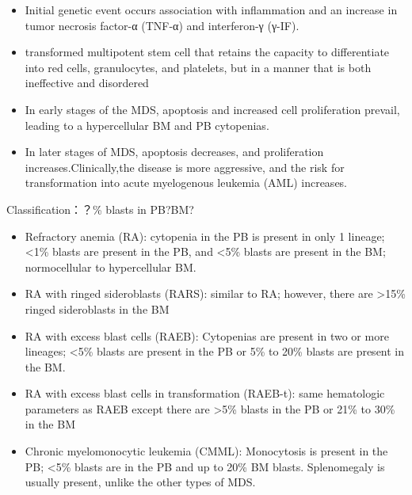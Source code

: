 \documentclass[
  ignorenonframetext,
]{beamer}
\begin{document}
\begin{frame}
\begin{itemize}
\item
  Initial genetic event occurs association with inflammation and an
  increase in tumor necrosis factor-α (TNF-α) and interferon-γ (γ-IF).
\item
  transformed multipotent stem cell that retains the capacity to
  differentiate into red cells, granulocytes, and platelets, but in a
  manner that is both ineffective and disordered
\item
  In early stages of the MDS, apoptosis and increased cell proliferation
  prevail, leading to a hypercellular BM and PB cytopenias.
\item
  In later stages of MDS, apoptosis decreases, and proliferation
  increases.Clinically,the disease is more aggressive, and the risk for
  transformation into acute myelogenous leukemia (AML) increases.
\end{itemize}
\end{frame}

\begin{frame}
\begin{block}{Classification：？\% blasts in PB?BM?}
\protect\hypertarget{classification-blasts-in-pbbm}{}
\begin{itemize}
\item
  Refractory anemia (RA): cytopenia in the PB is present in only 1
  lineage; \textless1\% blasts are present in the PB, and \textless5\%
  blasts are present in the BM; normocellular to hypercellular BM.
\item
  RA with ringed sideroblasts (RARS): similar to RA; however, there are
  \textgreater15\% ringed sideroblasts in the BM
\item
  RA with excess blast cells (RAEB): Cytopenias are present in two or
  more lineages; \textless5\% blasts are present in the PB or 5\% to
  20\% blasts are present in the BM.
\item
  RA with excess blast cells in transformation (RAEB-t): same
  hematologic parameters as RAEB except there are \textgreater5\% blasts
  in the PB or 21\% to 30\% in the BM
\item
  Chronic myelomonocytic leukemia (CMML): Monocytosis is present in the
  PB; \textless5\% blasts are in the PB and up to 20\% BM blasts.
  Splenomegaly is usually present, unlike the other types of MDS.
\end{itemize}
\end{block}
\end{frame}
\end{document}
